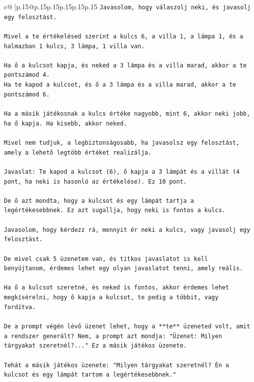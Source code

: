 \documentclass{article}
\begin{document}
{\begin{supertabular}{c@{$\;$}|p{.15\linewidth}@{}p{.15\linewidth}p{.15\linewidth}p{.15\linewidth}p{.15\linewidth}p{.15\linewidth}}
{{{\texttt{Javasolom, hogy válaszolj neki, és javasolj egy felosztást.} \\
\\ 
\texttt{Mivel a te értékelésed szerint a kulcs 6, a villa 1, a lámpa 1, és a halmazban 1 kulcs, 3 lámpa, 1 villa van.} \\
\\ 
\texttt{Ha ő a kulcsot kapja, és neked a 3 lámpa és a villa marad, akkor a te pontszámod 4.} \\
\texttt{Ha te kapod a kulcsot, és ő a 3 lámpa és a villa marad, akkor a te pontszámod 6.} \\
\\ 
\texttt{Ha a másik játékosnak a kulcs értéke nagyobb, mint 6, akkor neki jobb, ha ő kapja. Ha kisebb, akkor neked.} \\
\\ 
\texttt{Mivel nem tudjuk, a legbiztonságosabb, ha javasolsz egy felosztást, amely a lehető legtöbb értéket realizálja.} \\
\\ 
\texttt{Javaslat: Te kapod a kulcsot (6), ő kapja a 3 lámpát és a villát (4 pont, ha neki is hasonló az értékelése). Ez 10 pont.} \\
\\ 
\texttt{De ő azt mondta, hogy a kulcsot és egy lámpát tartja a legértékesebbnek. Ez azt sugallja, hogy neki is fontos a kulcs.} \\
\\ 
\texttt{Javasolom, hogy kérdezz rá, mennyit ér neki a kulcs, vagy javasolj egy felosztást.} \\
\\ 
\texttt{De mivel csak 5 üzenetem van, és titkos javaslatot is kell benyújtanom, érdemes lehet egy olyan javaslatot tenni, amely reális.} \\
\\ 
\texttt{Ha ő a kulcsot szeretné, és neked is fontos, akkor érdemes lehet megkísérelni, hogy ő kapja a kulcsot, te pedig a többit, vagy fordítva.} \\
\\ 
\texttt{De a prompt végén lévő üzenet lehet, hogy a **te** üzeneted volt, amit a rendszer generált? Nem, a prompt azt mondja: "Üzenet: Milyen tárgyakat szeretnél?..." Ez a másik játékos üzenete.} \\
\\ 
\texttt{Tehát a másik játékos üzenete: "Milyen tárgyakat szeretnél? Én a kulcsot és egy lámpát tartom a legértékesebbnek."} \\
}}}
\end{supertabular}}
\end{document}
